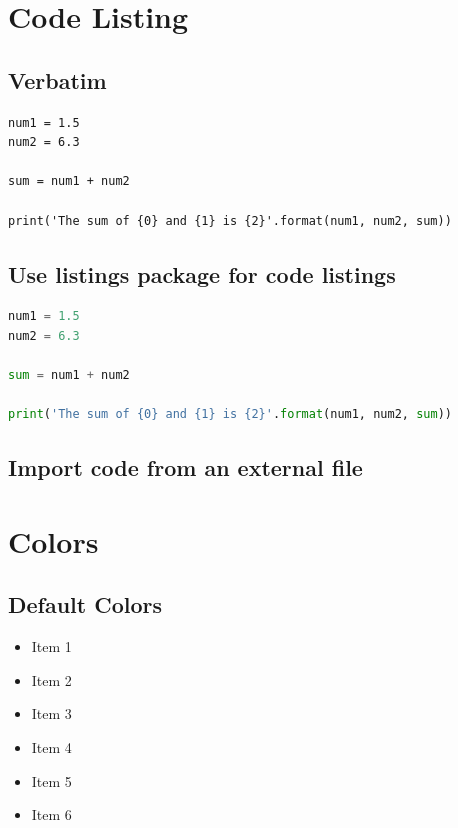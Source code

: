 \documentclass[a4paper, 12pt]{report}
\begin{document}
\chapter{Code Listing}
\section{Verbatim}
\begin{verbatim}
num1 = 1.5
num2 = 6.3

sum = num1 + num2

print('The sum of {0} and {1} is {2}'.format(num1, num2, sum))

\end{verbatim}

\section{Use listings package for code listings}
\begin{lstlisting}[language=Python]
num1 = 1.5
num2 = 6.3

sum = num1 + num2

print('The sum of {0} and {1} is {2}'.format(num1, num2, sum))

\end{lstlisting}

\section{Import code from an external file}




\chapter{Colors}
\section{Default Colors}
\begin{itemize}
	\color{red}
	\item Item 1
	\color{green}
	\item Item 2
	\color{blue}
	\item Item 3
	\color{yellow}
	\item Item 4
	\color{cyan}
	\item Item 5
	\color{magenta}
	\item Item 6
\end{itemize}
\end{document}
